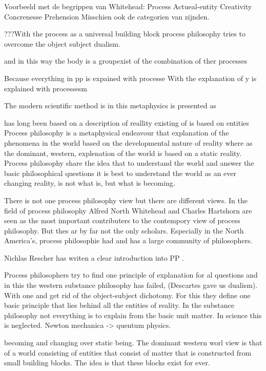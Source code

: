 Voorbeeld met de begrippen van Whitehead:
Process
Actueal-entity
Creativity
Concrenesse
Prehension
Misschien ook de categorien van zijnden.


???With the process as a universal building block process philosophy tries to overcome the object subject dualism.

and in this way the body is a groupexist of the combination of ther processes

Because everything in pp is expained with processe
With the explanation of y is explained with processesm




The modern scientific method is 
in this metaphysics is presented as 


has long been based on a description of reallity existing of 
is based on entities
Process philosophy is a metaphysical endeavour that  explanation of the phenomena in the world based on the developmental nature of reality where as the dominant, western, explenation of the world is based on a static reality. 
Process philosophy share the idea that to understand the world and answer the basic philosophical questions it is best to understand the world as an ever changing reality, is not what is, but what is becoming.

There is not one process philosophy view but there are different views.
In the field of process philosophy Alfred North Whitehead and Charles Hartshorn are seen as the most important contributers to the contempory view of process philosophy. 
But thes ar by far not the only scholars. Especially in the North America's, process philosophie had and has a large community of philosophers. 

Nichlas Rescher has writen a clear introduction into PP \cite{rescher1996process}.

Process philosophers try to find one principle of explanation for al questions and in this the western  substance philosophy has failed, (Descartes gave us dualism).
With one and get rid of the object-subject dichotomy. For this they define one basic principle that lies behind all the entities of reality. 
In the substance philosophy not everything is to explain from the basic unit matter. In science this is neglected.
Newton mechanica -> quentum physics.

becoming and changing over static being. The dominant western worl view is that of a world consisting of entities that consist of matter that is constructed from small building blocks. The idea is that these blocks exist for ever.



